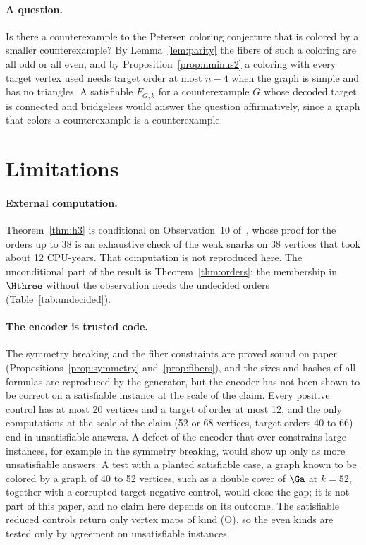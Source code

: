\paragraph{A question.} Is there a counterexample to the Petersen coloring conjecture that is colored by a smaller counterexample? By Lemma~\ref{lem:parity} the fibers of such a coloring are all odd or all even, and by Proposition~\ref{prop:nminus2} a coloring with every target vertex used needs target order at most $n - 4$ when the graph is simple and has no triangles. A satisfiable $F_{G,k}$ for a counterexample $G$ whose decoded target is connected and bridgeless would answer the question affirmatively, since a graph that colors a counterexample is a counterexample.

\section{Limitations}\label{sec:limitations}

\paragraph{External computation.} Theorem~\ref{thm:h3} is conditional on Observation~10 of~\cite{GJMMMU2026}, whose proof for the orders up to 38 is an exhaustive check of the weak snarks on 38 vertices that took about 12 CPU-years. That computation is not reproduced here. The unconditional part of the result is Theorem~\ref{thm:orders}; the membership in $\Hthree$ without the observation needs the undecided orders (Table~\ref{tab:undecided}).

\paragraph{The encoder is trusted code.} The symmetry breaking and the fiber constraints are proved sound on paper (Propositions~\ref{prop:symmetry} and~\ref{prop:fibers}), and the sizes and hashes of all formulas are reproduced by the generator, but the encoder has not been shown to be correct on a satisfiable instance at the scale of the claim. Every positive control has at most 20 vertices and a target of order at most 12, and the only
computations at the scale of the claim (52 or 68 vertices, target orders 40 to 66) end in unsatisfiable answers. A defect of the encoder that over-constrains large instances, for example in the symmetry breaking, would show up only as more unsatisfiable answers. A test with a planted satisfiable case, a graph known to be colored by a graph of 40 to 52 vertices, such as a double cover of $\Ga$ at $k = 52$, together with a corrupted-target
negative control, would close the gap; it is not part of this paper, and no claim here depends on its outcome. The satisfiable reduced controls return only vertex maps of kind (O), so the even kinds are tested only by agreement on unsatisfiable instances.

